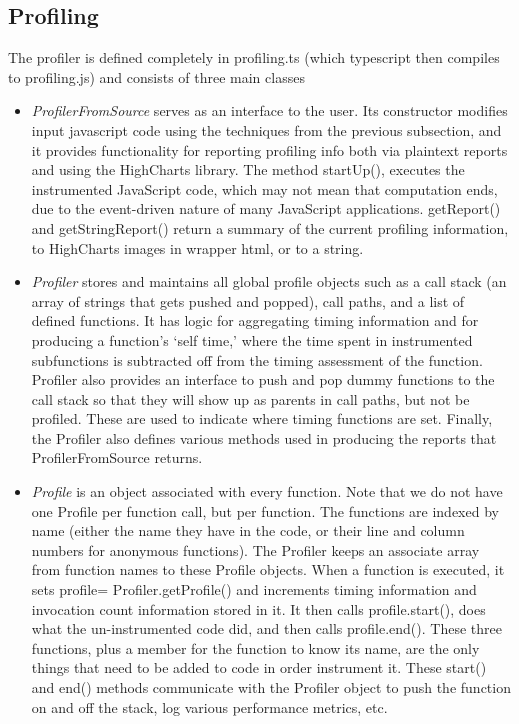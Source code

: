 \documentclass[11pt]{article}
\begin{document}
\subsection{Profiling}
	The profiler is defined completely in profiling.ts (which typescript then compiles to profiling.js) 
and consists of three main classes
\begin{itemize}
\item \textit{ProfilerFromSource} serves as an interface to the
  user. Its constructor modifies input javascript code using the
  techniques from the previous subsection, and it provides
  functionality for reporting profiling info both via plaintext
  reports and using the HighCharts library. The method startUp(), executes the
  instrumented JavaScript code, which may not mean that computation
  ends, due to the event-driven nature of many JavaScript
  applications. getReport() and getStringReport() return a summary of
  the current profiling information, to HighCharts images in wrapper
  html, or to a string. 

\item \textit{Profiler} stores and  maintains all global profile
  objects such as a call stack (an array of strings that gets pushed
  and popped), call paths, and a list of defined
  functions. It has logic for aggregating timing information and for
  producing a function's `self time,' where the time spent in
  instrumented subfunctions is subtracted off from the timing
  assessment of the function. Profiler also provides an interface to 
  push and pop dummy functions to the call stack so that they 
  will show up as parents in call paths, but not be profiled. 
  These are used to indicate where timing functions are set. 
  Finally, the Profiler also defines various methods used in producing the
 reports that ProfilerFromSource returns. 

\item \textit{Profile} is an object associated with every
  function. Note that we do not have one Profile per function call,
  but per function. The functions are indexed by name (either the name
  they have in the code, or their line and column numbers for
  anonymous functions). The Profiler keeps an associate array from
  function names to these Profile objects. When a function is
  executed, it sets profile= Profiler.getProfile() and increments timing
  information and invocation count information stored in it. It then
  calls profile.start(), does what the un-instrumented code did, and
  then calls profile.end(). These three functions, plus a member for
  the function to know its name, are the only things that need to be
  added to code in order instrument it. These start() and end()
  methods communicate with the Profiler object to push the function on
  and off the stack, log various performance metrics, etc.

\end{itemize}
\end{document}
